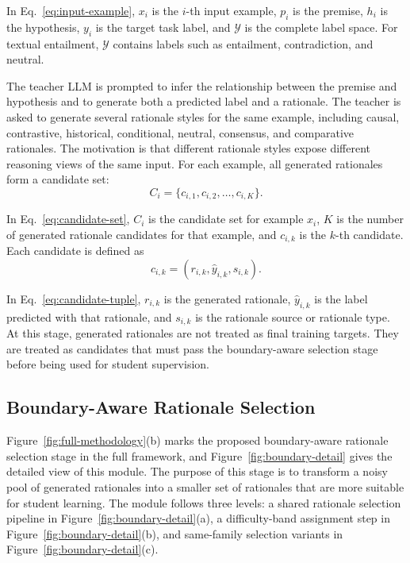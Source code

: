 In Eq.~\eqref{eq:input-example}, $x_i$ is the $i$-th input example, $p_i$ is the premise, $h_i$ is the hypothesis, $y_i$ is the target task label, and $\mathcal{Y}$ is the complete label space. For textual entailment, $\mathcal{Y}$ contains labels such as entailment, contradiction, and neutral.

The teacher LLM is prompted to infer the relationship between the premise and hypothesis and to generate both a predicted label and a rationale. The teacher is asked to generate several rationale styles for the same example, including causal, contrastive, historical, conditional, neutral, consensus, and comparative rationales. The motivation is that different rationale styles expose different reasoning views of the same input. For each example, all generated rationales form a candidate set:
\begin{equation}
    C_i = \{c_{i,1}, c_{i,2}, \ldots, c_{i,K}\}.
    \label{eq:candidate-set}
\end{equation}

In Eq.~\eqref{eq:candidate-set}, $C_i$ is the candidate set for example $x_i$, $K$ is the number of generated rationale candidates for that example, and $c_{i,k}$ is the $k$-th candidate. Each candidate is defined as
\begin{equation}
    c_{i,k} = (r_{i,k}, \hat{y}_{i,k}, s_{i,k}).
    \label{eq:candidate-tuple}
\end{equation}

In Eq.~\eqref{eq:candidate-tuple}, $r_{i,k}$ is the generated rationale, $\hat{y}_{i,k}$ is the label predicted with that rationale, and $s_{i,k}$ is the rationale source or rationale type. At this stage, generated rationales are not treated as final training targets. They are treated as candidates that must pass the boundary-aware selection stage before being used for student supervision.

\subsection{Boundary-Aware Rationale Selection}
\label{sec:boundary-selection}

Figure~\ref{fig:full-methodology}(b) marks the proposed boundary-aware rationale selection stage in the full framework, and Figure~\ref{fig:boundary-detail} gives the detailed view of this module. The purpose of this stage is to transform a noisy pool of generated rationales into a smaller set of rationales that are more suitable for student learning. The module follows three levels: a shared rationale selection pipeline in Figure~\ref{fig:boundary-detail}(a), a difficulty-band assignment step in Figure~\ref{fig:boundary-detail}(b), and same-family selection variants in Figure~\ref{fig:boundary-detail}(c).

